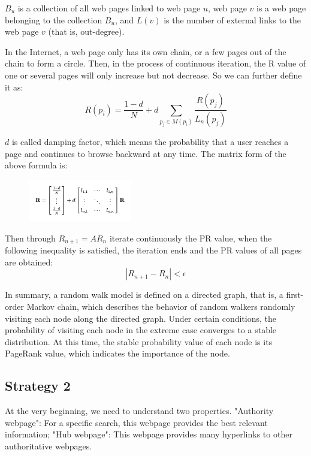 \documentclass{article}
\begin{document}
$B_u$ is a collection of all web pages linked to web page $u$, 
web page $v$ is a web page belonging to the collection $B_u$,
and $L(v)$ is the number of external links to the web page $v$ (that is, out-degree).

In the Internet, a web page only has its own chain, or a few pages out of the chain to form a circle. Then, in the process of continuous iteration, the R value of one or several pages will only increase but not decrease.
So we can further define it as:
\begin{equation}
    R(p_i) = \frac{1-d}{N} + d \sum_{p_j\in M(p_i)} \frac{R(p_j)}{L_n(p_j)}
\end{equation}

$d$ is called damping factor, which means the probability that a user reaches a page and continues to browse backward at any time.
The matrix form of the above formula is:

\begin{figure}[H]
    \centering
    \includegraphics[width=0.4\textwidth]{Fig2}
\end{figure}

Then through $R_{n+1} = AR_{n}$ iterate continuously the PR value,
when the following inequality is satisfied, the iteration ends and the PR values of all pages are obtained:
\begin{equation}
    |R_{n+1} - R_n | < \epsilon 
\end{equation}

In summary, a random walk model is defined on a directed graph, that is, a first-order Markov chain, which describes the behavior of random walkers randomly visiting each node along the directed graph. Under certain conditions, the probability of visiting each node in the extreme case converges to a stable distribution. At this time, the stable probability value of each node is its PageRank value, which indicates the importance of the node.

\subsection{Strategy 2}
At the very beginning, we need to understand two properties. "Authority webpage": For a specific search, this webpage provides the best relevant information; "Hub webpage": This webpage provides many hyperlinks to other authoritative webpages.
\end{document}
